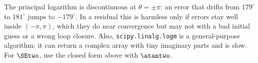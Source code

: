 \begin{pitfall}
The principal logarithm is discontinuous at $\theta=\pm\pi$: an error that drifts from $179^\circ$ to $181^\circ$ jumps to $-179^\circ$. In a residual this is harmless only if errors stay well inside $(-\pi,\pi)$, which they do near convergence but may not with a bad initial guess or a wrong loop closure. Also, \texttt{scipy.linalg.logm} is a general-purpose algorithm: it can return a complex array with tiny imaginary parts and is slow. For $\SEtwo$, use the closed form above with $\atantwo$.
\end{pitfall}
